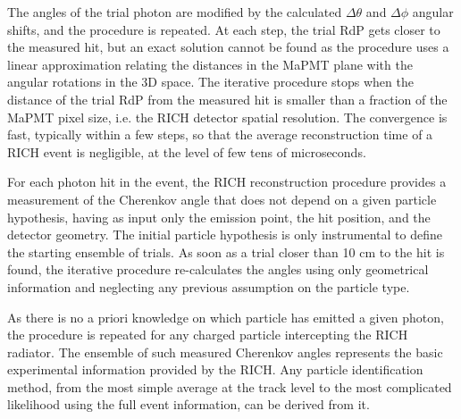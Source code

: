 The angles of the trial photon are modified by the calculated $\Delta\theta$ and $\Delta\phi$ angular shifts,
and the procedure is repeated. At each step, the trial RdP gets closer to the measured hit, but an exact solution
cannot be found as the procedure uses a linear approximation relating the distances in the MaPMT plane with the
angular rotations in the 3D space. The iterative procedure stops when the distance of the trial RdP from the
measured hit is smaller than a fraction of the MaPMT pixel size, i.e. the RICH detector spatial resolution. The
convergence is fast, typically within a few steps, so that the average reconstruction time of a RICH event is
negligible, at the level of few tens of microseconds.

For each photon hit in the event, the RICH reconstruction procedure provides a measurement of the Cherenkov
angle that does not depend on a given particle hypothesis, having as input only the emission point, the hit position,
and the detector geometry. The initial particle hypothesis is only instrumental to define the starting ensemble of
trials. As soon as a trial closer than 10 cm to the hit is found, the iterative procedure re-calculates the angles using
only geometrical information and neglecting any previous assumption on the particle type.

As there is no a priori knowledge on which particle has emitted a given photon, the procedure is repeated for any
charged particle intercepting the RICH radiator. The ensemble of such measured Cherenkov angles represents
the basic experimental information provided by the RICH. Any particle identification method, from the most
simple average at the track level to the most complicated likelihood using the full event information, can be derived
from it.
